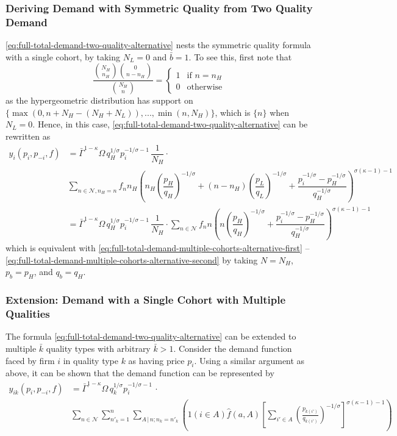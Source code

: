 \documentclass[12pt]{article}
\begin{document}
\subsubsection{Deriving Demand with Symmetric Quality from Two Quality Demand}
\eqref{eq:full-total-demand-two-quality-alternative} nests the symmetric quality formula with a single cohort, by taking $N_L = 0$ and $\bar b = 1$. To see this, first note that
\begin{equation}
\dfrac{\binom{N_H}{n_H} \binom{0}{n - n_H}}{\binom{N_H}{n}} = 
\begin{cases}
1 & \text{if $n = n_H$} \\
0 & \text{otherwise} 
\end{cases}
\end{equation}
as the hypergeometric distribution has support on $\{\max(0, n+N_H - (N_H + N_L) ), ..., \min (n, N_H )  \}$, which is $\{n\}$ when $N_L = 0$. Hence, in this case, \eqref{eq:full-total-demand-two-quality-alternative} can be rewritten as
\begin{align}
 y_{i}(p_i, p_{-i}, f) 
&=  \bar{\Gamma}^{1-\kappa}\Omega \, q_H^{1/\sigma}p_i^{-1/\sigma - 1}\, \dfrac{1}{N_H} \cdot \\ 
&\sum_{n \in \mathcal{N}, n_H = n } f_{n}  
n_H 
\left( 
n_H \left( \dfrac{p_{H}}{q_{H}}   \right)^{-1/\sigma} +  
(n - n_H) \left( \dfrac{p_{L}}{q_{L}}   \right)^{-1/\sigma} +
\dfrac{p_i^{-1/\sigma} - p^{-1/\sigma}_{H} }{ q_H^{-1/\sigma }} 
\right)^{\sigma (\kappa - 1)-1}  \\
&=  \bar{\Gamma}^{1-\kappa}\Omega \, q_H^{1/\sigma}p_i^{-1/\sigma - 1}\, \dfrac{1}{N_H} \cdot \sum_{n \in \mathcal{N}} f_{n}  
n
\left( 
n \left( \dfrac{p_{H}}{q_{H}}   \right)^{-1/\sigma} +  
\dfrac{p_i^{-1/\sigma} - p^{-1/\sigma}_{H} }{ q_H^{-1/\sigma }} 
\right)^{\sigma (\kappa - 1)-1}
\end{align}
which is equivalent with \eqref{eq:full-total-demand-multiple-cohorts-alternative-first} -- \eqref{eq:full-total-demand-multiple-cohorts-alternative-second} by taking $N = N_H$, $p_b = p_H$, and $q_b = q_H$.


\subsubsection{Extension: Demand with a Single Cohort with Multiple Qualities}
The formula \eqref{eq:full-total-demand-two-quality-alternative} can be extended to multiple ${\bar k}$ quality types with arbitrary ${\bar k} > 1$. Consider the demand function faced by firm $i$ in quality type $k$ as having price $p_i$. Using a similar argument as above, it can be shown that the demand function can be represented by
\begin{align}
y_{ik}(p_i, p_{-i}, f) 
&= \bar{\Gamma}^{1-\kappa}\Omega \, q_k^{1/\sigma}p_i^{-1/\sigma - 1}\, \cdot \\ 
&\sum_{n \in \mathcal{N} } \sum_{n'_k =1}^n \sum_{{A}\,|\,n; n_k = n'_k}\left( 1( i \in A ) \hat{f}(a,A)\left[\sum_{i'\in A}\left( \frac{p_{k(i')}}{q_{k(i')}}\right)^{-1/\sigma}\right]^{\sigma (\kappa - 1)-1}\right)  
\label{eq:full-total-demand-multiple-quality-summand}
\end{align}
\end{document}
